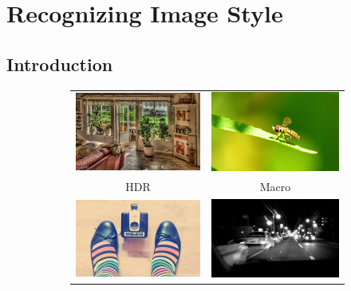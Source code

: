\chapter{Recognizing Image Style}\label{sec:style_chapter}

\section{Introduction}
\begin{figure}[t]
\small{
\centering
\begin{subfigure}[t]{0.48\linewidth}
    \begin{tabular}{cc}
        \includegraphics[width=.43\linewidth]{../style/figures/flickrDatasetExamples/used/resized/hdr.jpg} &
    \includegraphics[width=.43\linewidth]{../style/figures/flickrDatasetExamples/used/resized/macro.jpg} \\
    HDR & Macro \\
        \includegraphics[width=.43\linewidth]{../style/figures/flickrDatasetExamples/used/resized/vintage.jpg} &
    \includegraphics[width=.43\linewidth]{../style/figures/flickrDatasetExamples/used/resized/noir.jpg} \\

\end{tabular}
\end{subfigure}}
\end{figure}
